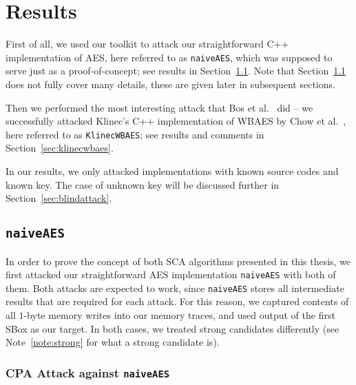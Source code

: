 \section{Results}
\label{sec:results}

First of all, we used our toolkit to attack our straightforward C++ implementation of AES, here referred to as {\tt naiveAES}, which was supposed to serve just as a proof-of-concept; see results in Section~\ref{sec:naiveaes}. Note that Section~\ref{sec:naiveaes} does not fully cover many details, these are given later in subsequent sections.

Then we performed the most interesting attack that Bos et al.\ \cite{bos2015differential} did -- we successfully attacked Klinec's C++ implementation \cite{klinec2013implementation} of WBAES by Chow et al.\ \cite{chow2002aes}, here referred to as {\tt KlinecWBAES}; see results and comments in Section~\ref{sec:klinecwbaes}.

\begin{note}
\label{note:expdes}
	In our results, we only attacked implementations with known source codes and known key. The case of unknown key will be discussed further in Section~\ref{sec:blindattack}.
\end{note}



\subsection{\tt naiveAES}
\label{sec:naiveaes}

In order to prove the concept of both SCA algorithms presented in this thesis, we first attacked our straightforward AES implementation {\tt naiveAES} with both of them. Both attacks are expected to work, since {\tt naiveAES} stores all intermediate results that are required for each attack. For this reason, we captured contents of all $1$-byte memory writes into our memory traces, and used output of the first SBox as our target. In both cases, we treated strong candidates differently (see Note~\ref{note:strong} for what a strong candidate is).

\subsubsection{CPA Attack against {\tt naiveAES}}
	
